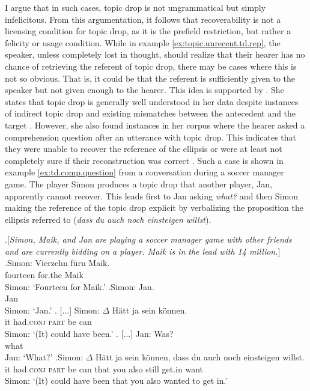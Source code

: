 I argue that in such cases, topic drop is not ungrammatical but simply infelicitous.
From this argumentation, it follows that recoverability is not a licensing condition for topic drop, as it is the prefield restriction, but rather a felicity or usage condition.
While in example \ref{ex:topic.unrecent.td.rep}, the speaker, unless completely lost in thought, should realize that their hearer has no chance of retrieving the referent of topic drop, there may be cases where this is not so obvious.
That is, it could be that the referent is sufficiently given  to the speaker but not given  enough to the hearer.
This idea is supported by \citet{helmer2016}.
She states that topic drop is generally well understood in her data despite instances of indirect topic drop and existing mismatches between the  antecedent and the target \citep[181]{helmer2016}.
However, she also found instances in her corpus  where the hearer asked a comprehension question after an utterance with topic drop.
This indicates that they were unable to recover the reference of the ellipsis or were at least not completely sure if their reconstruction was correct \citep[190--191]{helmer2016}.
Such a case is shown in example \ref{ex:td.comp.question} from a conversation during a soccer manager game.
The player Simon produces a topic drop that another player, Jan, apparently cannot recover.
This leads first to Jan asking \textit{what?} and then Simon making the reference of the topic drop explicit by verbalizing the proposition the ellipsis referred to (\textit{dass du auch noch einsteigen willst}). 

\ex.\label{ex:td.comp.question}[\textit{Simon, Maik, and Jan are playing a soccer manager game with other friends and are currently bidding on a player.
Maik is in the lead with 14 million.}]
\ag.Simon: Vierzehn fürn Maik.\\
{} fourteen for.the Maik\\
Simon: `Fourteen for Maik.'
\bg.Simon: Jan.\\
{} Jan\\
Simon: `Jan.'
\cg. [...] Simon: $\Delta$ Hätt ja sein können.\\
{} {} it had.\textsc{conj} \textsc{part} be can\\
Simon: `(It) could have been.'
\dg. [...] Jan: Was?\\
{} {} what\\
[...] Jan: `What?'
\eg.Simon: $\Delta$ Hätt ja sein können, dass du auch noch einsteigen willst.\\
{} it had.\textsc{conj} \textsc{part} be can that you also still get.in want\\
Simon: `(It) could have been that you also wanted to get in.' \citep[190, adapted]{helmer2016}

